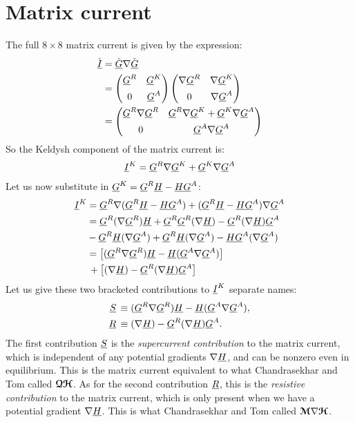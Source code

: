 \clearpage
\section{Matrix current}
The full $8\times8$ matrix current is given by the expression:
\begin{align}
  \check{\underline{I}} 
  &= 
  \check{\underline{G}} \nabla \check{\underline{G}}
  \\ &= 
  \begin{pmatrix} 
    \underline{G}^R  & \underline{G}^K \\[1ex] 0 & \underline{G}^A
  \end{pmatrix}
  \begin{pmatrix} 
    \nabla\underline{G}^R  & \nabla\underline{G}^K \\[1ex] 0 & \nabla\underline{G}^A
  \end{pmatrix}
  \\ &= 
  \begin{pmatrix} 
    \underline{G}^R\nabla\underline{G}^R  & \underline{G}^R\nabla\underline{G}^K + \underline{G}^K\nabla\underline{G}^A \\[1ex] 0 & \underline{G}^A\nabla\underline{G}^A
  \end{pmatrix}
\end{align}
So the Keldysh component of the matrix current is:
\begin{align}
  \underline{I}^K = \underline{G}^R\nabla\underline{G}^K + \underline{G}^K\nabla\underline{G}^A
\end{align}
Let us now substitute in $\underline{G}^K = \underline{G}^R \underline{H} - \underline{H} \underline{G}^A$:
\begin{align*}
  \underline{I}^K 
  &= 
  \underline{G}^R\nabla(\underline{G}^R \underline{H} - \underline{H} \underline{G}^A)+ (\underline{G}^R \underline{H} - \underline{H} \underline{G}^A) \nabla\underline{G}^A 
  \\ &=
  \underline{G}^R(\nabla\underline{G}^R) \underline{H} + \underline{G}^R\underline{G}^R (\nabla\underline{H}) - \underline{G}^R (\nabla\underline{H}) \underline{G}^A 
  \\ &
  - \underline{G}^R \underline{H} (\nabla\underline{G}^A) + \underline{G}^R \underline{H}(\nabla\underline{G}^A) - \underline{H} \underline{G}^A (\nabla\underline{G}^A)
  \\ &=
  \big[ (\underline{G}^R \nabla \underline{G}^R) \underline{H} - \underline{H} (\underline{G}^A \nabla \underline{G}^A) \big]
  \\ &\,+
  \big[ (\nabla\underline{H}) - \underline{G}^R (\nabla\underline{H}) \underline{G}^A \big]
\end{align*}
Let us give these two bracketed contributions to $\underline{I}^K$ separate names:
\begin{align}
  \underline{S}\, &\equiv (\underline{G}^R \nabla \underline{G}^R) \underline{H} - \underline{H} (\underline{G}^A \nabla \underline{G}^A),  \\
  \underline{R}\, &\equiv (\nabla\underline{H}) - \underline{G}^R (\nabla\underline{H}) \underline{G}^A.
\end{align}
The first contribution $\underline{S}$ is the \emph{supercurrent contribution} to the matrix current, which is independent of any potential gradients $\nabla\underline{H}$, and can be nonzero even in equilibrium.
This is the matrix current equivalent to what Chandrasekhar and Tom called $\bm{\mathcal{Q}}\bm{\mathcal{H}}$.
As for the second contribution $\underline{R}$, this is the \emph{resistive contribution} to the matrix current, which is only present when we have a potential gradient $\nabla\underline{H}$.
This is what Chandrasekhar and Tom called $\bm{\mathcal{M}}\nabla\bm{\mathcal{H}}$.

